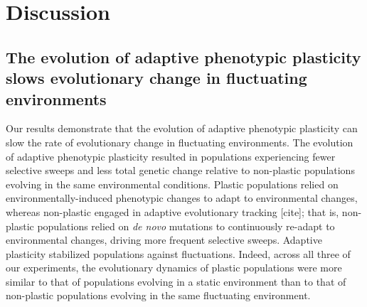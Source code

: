 

\section{Discussion}

\subsection{The evolution of adaptive phenotypic plasticity slows evolutionary change in fluctuating environments}

Our results demonstrate that the evolution of adaptive phenotypic plasticity can slow the rate of evolutionary change in fluctuating environments.
The evolution of adaptive phenotypic plasticity resulted in populations experiencing fewer selective sweeps and less total genetic change relative to non-plastic populations evolving in the same environmental conditions.
Plastic populations relied on environmentally-induced phenotypic changes to adapt to environmental changes, whereas non-plastic engaged in adaptive evolutionary tracking [cite]; that is, non-plastic populations relied on \textit{de novo} mutations to continuously re-adapt to environmental changes, driving more frequent selective sweeps.
Adaptive plasticity stabilized populations against fluctuations.
Indeed, across all three of our experiments, the evolutionary dynamics of plastic populations were more similar to that of populations evolving in a static environment than to that of non-plastic populations evolving in the same fluctuating environment.

